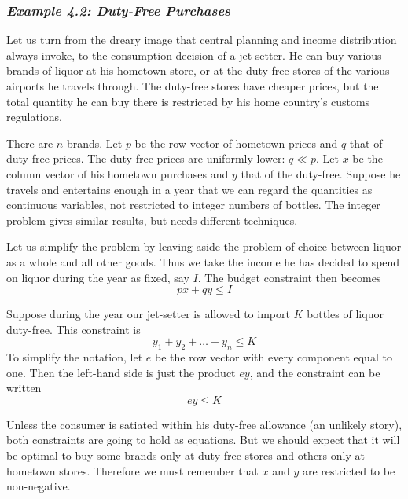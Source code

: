 \subsubsection*{\textit{Example 4.2: Duty-Free Purchases}}

Let us turn from the dreary image that central planning and income distribution always invoke, to the consumption decision of a jet-setter. He can buy various brands of liquor at his hometown store, or at the duty-free stores of the various airports he travels through. The duty-free stores have cheaper prices, but the total quantity he can buy there is restricted by his home country's customs regulations.

There are $n$ brands. Let $p$ be the row vector of hometown prices and $q$ that of duty-free prices. The duty-free prices are uniformly lower: $ q \ll p$. Let $x$ be the column vector of his hometown purchases and $y$ that of the duty-free. Suppose he travels and entertains enough in a year that we can regard the quantities as continuous variables, not restricted to integer numbers of bottles. The integer problem gives similar results, but needs different techniques.

Let us simplify the problem by leaving aside the problem of choice between liquor as a whole and all other goods. Thus we take the income he has decided to spend on liquor during the year as fixed, say $I$. The budget constraint then becomes
\begin{equation} \label{equa4.9}
  px + qy \leq I
\end{equation}

Suppose during the year our jet-setter is allowed to import $K$ bottles of liquor duty-free. This constraint is
\begin{equation*}
 y_1 + y_2 + \dots + y_n \leq K
\end{equation*}
To simplify the notation, let $e$ be the row vector with every component equal to one. Then the left-hand side is just the product $ey$, and the constraint can be written
\begin{equation} \label{equa4.10}
 e y \leq K
\end{equation}

Unless the consumer is satiated within his duty-free allowance (an unlikely story), both constraints are going to hold as equations. But we should expect that it will be optimal to buy some brands only at duty-free stores and others only at hometown stores. Therefore we must remember that $x$ and $y$ are restricted to be non-negative.

